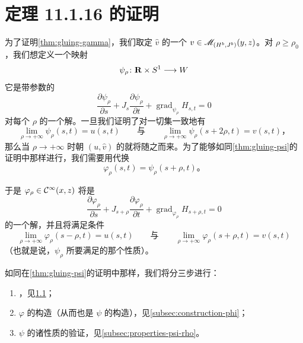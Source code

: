 
\section{定理 11.1.16 的证明}
\label{sec:proof-theorem-11116}

为了证明\cref{thm:gluing-gamma}，我们取定 $\widehat{v}$ 的一个\trLift{} $v\in\mathscr{M}_{(H^{b},J^{b})}(y,z)$。对 $\rho\ge\rho_{0}$，我们想定义一个映射
\[
\psi_{\rho}\colon\mathbf{R}\times S^{1}\longrightarrow W
\]
它是带参数的\trFloerEquation
\[
\frac{\partial\psi_{\rho}}{\partial s}+J_{s}\frac{\partial\psi_{\rho}}{\partial t}+\operatorname{grad}_{\psi_{\rho}}H_{s,t}=0
\]
对每个 $\rho$ 的一个解。一旦我们证明了对一切\trCompact{}集一致地有
\[
\lim_{\rho\to+\infty}\psi_{\rho}(s,t)=u(s,t)
\qquad\text{与}\qquad
\lim_{\rho\to+\infty}\psi_{\rho}(s+2\rho,t)=v(s,t)\text{，}
\]
那么当 $\rho\to+\infty$ 时朝 $(u,\widehat{v})$ 的\trConvergence{}就将随之而来。为了能够如同\cref{thm:gluing-psi}的证明中那样进行，我们需要用代换
\[
\varphi_{\rho}(s,t)=\psi_{\rho}(s+\rho,t)\text{。}
\]

于是 $\varphi_{\rho}\in\mathcal{C}^{\infty}(x,z)$ 将是
\[
\frac{\partial\varphi_{\rho}}{\partial s}+J_{s+\rho}\frac{\partial\varphi_{\rho}}{\partial t}+\operatorname{grad}_{\varphi_{\rho}}H_{s+\rho,t}=0
\]
的一个解，并且将满足条件
\[
\lim_{\rho\to+\infty}\varphi_{\rho}(s-\rho,t)=u(s,t)
\qquad\text{与}\qquad
\lim_{\rho\to+\infty}\varphi_{\rho}(s+\rho,t)=v(s,t)
\]
（也就是说，$\psi_{\rho}$ 所要满足的那个\trConvergence{}性质）。

如同在\cref{thm:gluing-psi}的证明中那样，我们将分三步进行：
\begin{enumerate}[label=(\arabic*)]
\item \trPregluing，见\cref{subsec:pregluing-gamma}；
\item $\varphi$ 的构造（从而也是 $\psi$ 的构造），见\cref{subsec:construction-phi}；
\item $\psi$ 的诸性质的验证，见\cref{subsec:properties-psi-rho}。
\end{enumerate}

\subsection{\trPregluing}
\label{subsec:pregluing-gamma}


